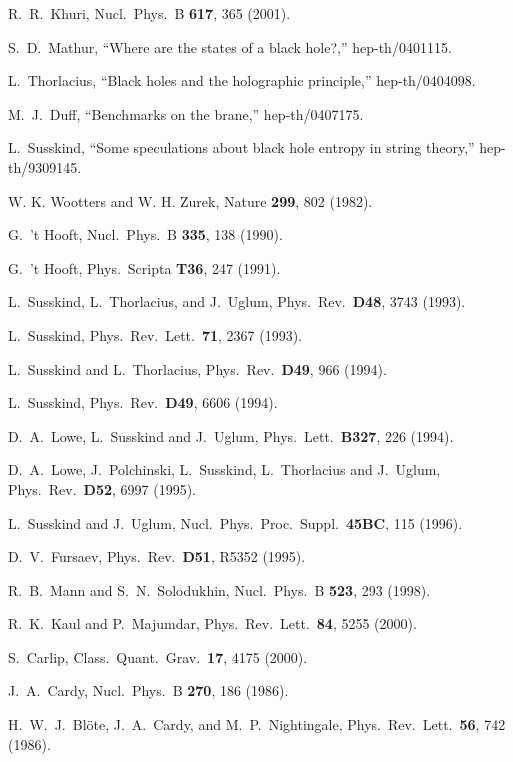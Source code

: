 \documentclass[12pt]{article} \usepackage{latexsym}
\begin{document}
\begin{thebibliography}{99}
 R.~R.~Khuri, Nucl.\ Phys.\ B {\bf 617}, 365 (2001).

 S.~D.~Mathur, ``Where are the states of a black hole?,''
  hep-th/0401115.
   
 L.~Thorlacius, ``Black holes and the holographic
principle,'' hep-th/0404098.

 M.~J.~Duff, ``Benchmarks on the brane,''
  hep-th/0407175.

 L.~Susskind, ``Some speculations about black hole
   entropy in string theory,'' hep-th/9309145.

 W. K. Wootters and W. H. Zurek, Nature {\bf 299}, 802
  (1982).

 G.~'t Hooft, Nucl.\ Phys.\ B {\bf 335}, 138 (1990).

 G.~'t Hooft, Phys.\ Scripta {\bf T36}, 247 (1991).

 L.~Susskind, L.~Thorlacius, and J.~Uglum, Phys.\ Rev.\
  {\bf D48}, 3743 (1993).

 L.~Susskind, Phys.\ Rev.\ Lett.\ {\bf 71}, 2367 (1993).

 L.~Susskind and L.~Thorlacius, Phys.\ Rev.\ {\bf D49},
  966 (1994).

 L.~Susskind, Phys.\ Rev.\ {\bf D49}, 6606 (1994).

 D.~A.~Lowe, L.~Susskind and J.~Uglum, Phys.\ Lett.\ 
  {\bf B327}, 226 (1994).

 D.~A.~Lowe, J.~Polchinski, L.~Susskind, L.~Thorlacius
  and J.~Uglum, Phys.\ Rev.\ {\bf D52}, 6997 (1995).

 L.~Susskind and J.~Uglum, Nucl.\ Phys.\ Proc.\ Suppl.\
  {\bf 45BC}, 115 (1996).

\bibitem{Fur} D.~V.~Fursaev, Phys.\ Rev.\ {\bf D51}, R5352 (1995).

 R.~B.~Mann and S.~N.~Solodukhin, Nucl.\ Phys.\ B {\bf
523}, 293 (1998).

\bibitem{KM} R.~K.~Kaul and P.~Majumdar, Phys.\ Rev.\ Lett.\ {\bf 84},
5255 (2000).

\bibitem{Carlip} S.~Carlip, Class.\ Quant.\ Grav.\ {\bf 17}, 4175
(2000).

\bibitem{Cardy} J.~A.~Cardy, Nucl.\ Phys.\ B {\bf 270}, 186 (1986).

 H.~W.~J.~Bl\"{o}te, J.~A.~Cardy, and M.~P.~Nightingale,
Phys.\ Rev.\ Lett.\ {\bf 56}, 742 (1986).


\end{thebibliography}
\end{document}
